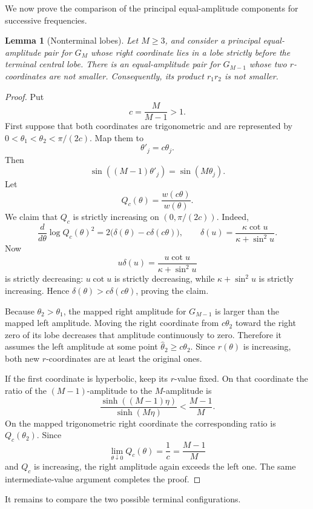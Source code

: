 \documentclass[11pt]{article}
\newtheorem{lemma}{Lemma}
\begin{document}
We now prove the comparison of the principal equal-amplitude components for
successive frequencies.

\begin{lemma}[Nonterminal lobes]
Let \(M\geq3\), and consider a principal equal-amplitude pair for \(G_M\)
whose right coordinate lies in a lobe strictly before the terminal central
lobe. There is an equal-amplitude pair for \(G_{M-1}\) whose two \(r\)-coordinates
are not smaller. Consequently, its product \(r_1r_2\) is not smaller.
\end{lemma}

\begin{proof}
Put
\[
c=\frac{M}{M-1}>1.
\]
First suppose that both coordinates are trigonometric and are represented by
\(0<\theta_1<\theta_2<\pi/(2c)\). Map them to
\[
\theta'_j=c\theta_j.
\]
Then
\[
\sin((M-1)\theta'_j)=\sin(M\theta_j).
\]
Let
\[
Q_c(\theta)=\frac{w(c\theta)}{w(\theta)}.
\]
We claim that \(Q_c\) is strictly increasing on
\((0,\pi/(2c))\). Indeed,
\[
\frac{d}{d\theta}\log Q_c(\theta)^2
 =2\bigl(\delta(\theta)-c\delta(c\theta)\bigr),
\qquad
\delta(u)=\frac{\kappa\cot u}{\kappa+\sin^2u}.
\tag{29}
\]
Now
\[
u\delta(u)
 =\frac{u\cot u}{\kappa+\sin^2u}
\]
is strictly decreasing: \(u\cot u\) is strictly decreasing, while
\(\kappa+\sin^2u\) is strictly increasing. Hence
\(\delta(\theta)>c\delta(c\theta)\), proving the claim.

Because \(\theta_2>\theta_1\), the mapped right amplitude for \(G_{M-1}\) is
larger than the mapped left amplitude. Moving the right coordinate from
\(c\theta_2\) toward the right zero of its lobe decreases that amplitude
continuously to zero. Therefore it assumes the left amplitude at some point
\(\widehat\theta_2\geq c\theta_2\). Since \(r(\theta)\) is increasing, both
new \(r\)-coordinates are at least the original ones.

If the first coordinate is hyperbolic, keep its \(r\)-value fixed. On that
coordinate the ratio of the \((M-1)\)-amplitude to the \(M\)-amplitude is
\[
\frac{\sinh((M-1)\eta)}{\sinh(M\eta)}
 <\frac{M-1}{M}.
\tag{30}
\]
On the mapped trigonometric right coordinate the corresponding ratio is
\(Q_c(\theta_2)\). Since
\[
\lim_{\theta\downarrow0}Q_c(\theta)=\frac1c=\frac{M-1}{M}
\]
and \(Q_c\) is increasing, the right amplitude again exceeds the left one.
The same intermediate-value argument completes the proof.
\end{proof}

It remains to compare the two possible terminal configurations.
\end{document}
